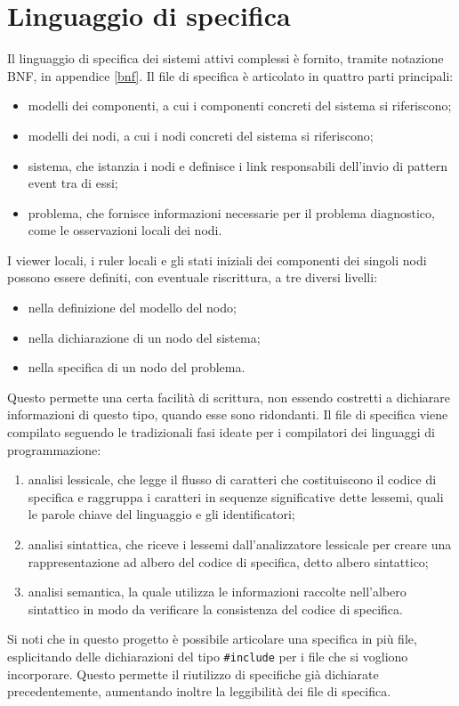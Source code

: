\newpage
\section{Linguaggio di specifica}
Il linguaggio di specifica dei sistemi attivi complessi è fornito, tramite notazione BNF, in appendice \ref{bnf}. 
Il file di specifica è articolato in quattro parti principali:
\begin{itemize}
\item modelli dei componenti, a cui i componenti concreti del sistema si riferiscono;
\item modelli dei nodi, a cui i nodi concreti del sistema si riferiscono;
\item sistema, che istanzia i nodi e definisce i link responsabili dell'invio di pattern event tra di essi;
\item problema, che fornisce informazioni necessarie per il problema diagnostico, come le osservazioni locali dei nodi.
\end{itemize}
I viewer locali, i ruler locali e gli stati iniziali dei componenti dei singoli nodi possono essere definiti, con eventuale riscrittura, a tre diversi livelli:
\begin{itemize}
\item nella definizione del modello del nodo;
\item nella dichiarazione di un nodo del sistema;
\item nella specifica di un nodo del problema.
\end{itemize}
Questo permette una certa facilità di scrittura, non essendo costretti a dichiarare informazioni di questo tipo, quando esse sono ridondanti.
Il file di specifica viene compilato seguendo le tradizionali fasi ideate per i compilatori dei linguaggi di programmazione:
\begin{enumerate}
\item analisi lessicale, che legge il flusso di caratteri che costituiscono il codice di specifica e raggruppa i caratteri in sequenze significative dette lessemi, quali le parole chiave del linguaggio e gli identificatori;
\item analisi sintattica, che riceve i lessemi dall'analizzatore lessicale per creare una rappresentazione ad albero del codice di specifica, detto albero sintattico;
\item analisi semantica, la quale utilizza le informazioni raccolte nell'albero sintattico in modo da verificare la consistenza del codice di specifica.
\end{enumerate}
Si noti che in questo progetto è possibile articolare una specifica in più file, esplicitando delle dichiarazioni del tipo \verb|#include| per i file che si vogliono incorporare. 
Questo permette il riutilizzo di specifiche già dichiarate precedentemente, aumentando inoltre la leggibilità dei file di specifica.


